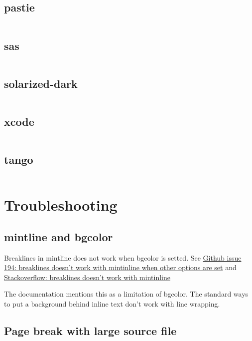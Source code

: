 \documentclass{article}
\begin{document}
\subsection{pastie}
\inputminted[bgcolor=AntiqueWhite]{c}{../code/helloworld.c}

\subsection{sas}
\inputminted[bgcolor=AntiqueWhite]{c}{../code/helloworld.c}

\subsection{solarized-dark}
\inputminted[bgcolor=AntiqueWhite]{c}{../code/helloworld.c}

\subsection{xcode}
\inputminted[bgcolor=AntiqueWhite]{c}{../code/helloworld.c}

\subsection{tango}
\inputminted[bgcolor=AntiqueWhite]{c}{../code/helloworld.c}

\section{Troubleshooting}

\subsection{mintline and bgcolor}

Breaklines in mintline does not work when bgcolor is setted. 
See 
\href{https://github.com/gpoore/minted/issues/194}{Github issue 194: breaklines doesn't work with mintinline when other options are set}
and 
\href{https://tex.stackexchange.com/questions/419934/breaklines-doesnt-work-with-mintinline}{Stackoverflow: breaklines doesn't work with mintinline}

The documentation mentions this as a limitation of bgcolor. The standard ways to put a background behind inline text don't work with line wrapping.

\subsection{Page break with large source file}
\end{document}
